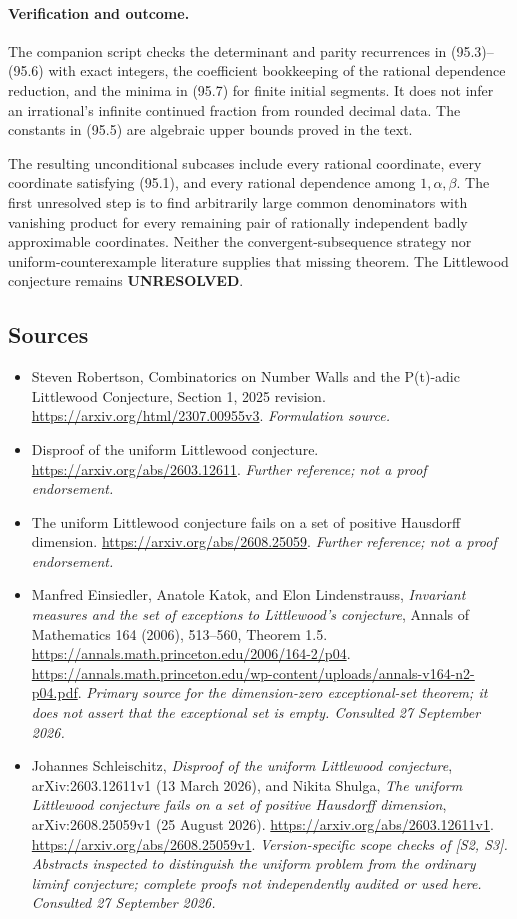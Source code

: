 \documentclass[11pt]{article}
\begin{document}
\paragraph{Verification and outcome.}
The companion script checks the determinant and parity recurrences in
(95.3)--(95.6) with exact integers, the coefficient bookkeeping of the
rational dependence reduction, and the minima in (95.7) for finite initial
segments. It does not infer an irrational's infinite continued fraction
from rounded decimal data. The constants in (95.5) are algebraic upper
bounds proved in the text.

The resulting unconditional subcases include every rational coordinate,
every coordinate satisfying (95.1), and every rational dependence among
$1,\alpha,\beta$. The first unresolved step is to find arbitrarily large
common denominators with vanishing product for every remaining pair of
rationally independent badly approximable coordinates. Neither the
convergent-subsequence strategy nor uniform-counterexample literature
supplies that missing theorem. The Littlewood conjecture remains
\textbf{UNRESOLVED}.

\subsection{Sources}
\begin{itemize}
\item[S1]Steven Robertson, Combinatorics on Number Walls and the P(t)-adic Littlewood Conjecture, Section 1, 2025 revision.
\url{https://arxiv.org/html/2307.00955v3}.
\textit{Formulation source.}
\item[S2]Disproof of the uniform Littlewood conjecture.
\url{https://arxiv.org/abs/2603.12611}.
\textit{Further reference; not a proof endorsement.}
\item[S3]The uniform Littlewood conjecture fails on a set of positive Hausdorff dimension.
\url{https://arxiv.org/abs/2608.25059}.
\textit{Further reference; not a proof endorsement.}

\item[E1]Manfred Einsiedler, Anatole Katok, and Elon Lindenstrauss,
\emph{Invariant measures and the set of exceptions to Littlewood's
conjecture}, Annals of Mathematics 164 (2006), 513--560, Theorem 1.5.
\url{https://annals.math.princeton.edu/2006/164-2/p04}.
\url{https://annals.math.princeton.edu/wp-content/uploads/annals-v164-n2-p04.pdf}.
\textit{Primary source for the dimension-zero exceptional-set theorem;
it does not assert that the exceptional set is empty.
Consulted 27 September 2026.}
\item[E2]Johannes Schleischitz, \emph{Disproof of the uniform Littlewood
conjecture}, arXiv:2603.12611v1 (13 March 2026), and Nikita Shulga,
\emph{The uniform Littlewood conjecture fails on a set of positive Hausdorff
dimension}, arXiv:2608.25059v1 (25 August 2026).
\url{https://arxiv.org/abs/2603.12611v1}.
\url{https://arxiv.org/abs/2608.25059v1}.
\textit{Version-specific scope checks of [S2, S3]. Abstracts inspected to
distinguish the uniform problem from the ordinary liminf conjecture;
complete proofs not independently audited or used here.
Consulted 27 September 2026.}
\end{itemize}
\end{document}
